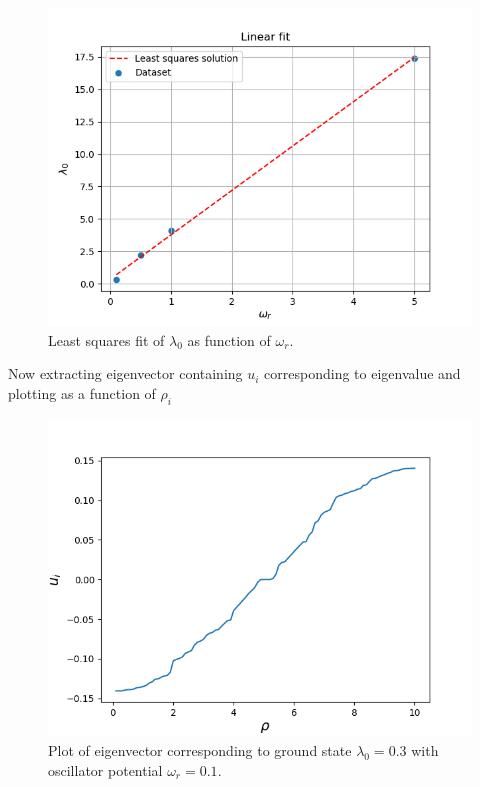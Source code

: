 \documentclass[aip,nobalancelastpage,
twocolumn,
rsi,%
 amsmath,amssymb,
 reprint,%
]{revtex4}
\begin{document}
\begin{figure}[H]
\center
\includegraphics[scale=0.5]{lsqfit.png}
\caption{Least squares fit of $\lambda_0$ as function of $\omega_r$.}
\label{part 3: plot 5}
\end{figure}

Now extracting eigenvector containing $u_i$ corresponding to eigenvalue and plotting as a function of $\rho_i$

\begin{figure}[H]
\center
\includegraphics[scale=0.5]{wr001.png}
\caption{Plot of eigenvector corresponding to ground state $\lambda_0=0.3$ with oscillator potential $\omega_r = 0.1$.}
\label{part 3: plot 1}
\end{figure}
\end{document}
